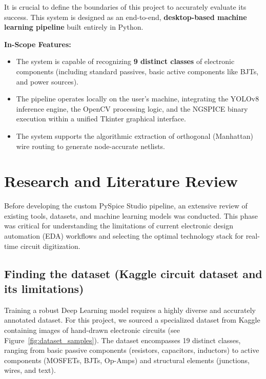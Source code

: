 \documentclass[12pt]{article}
\begin{document}
It is crucial to define the boundaries of this project to accurately evaluate its success. This system is designed as an end-to-end, \textbf{desktop-based machine learning pipeline} built entirely in Python.

\vspace{0.5cm}
\noindent \textbf{In-Scope Features:}
\begin{itemize}
    \item The system is capable of recognizing \textbf{9 distinct classes} of electronic components (including standard passives, basic active components like BJTs, and power sources).
    \item The pipeline operates locally on the user's machine, integrating the YOLOv8 inference engine, the OpenCV processing logic, and the NGSPICE binary execution within a unified Tkinter graphical interface.
    \item The system supports the algorithmic extraction of orthogonal (Manhattan) wire routing to generate node-accurate netlists.
\end{itemize}

\section{Research and Literature Review}

Before developing the custom PySpice Studio pipeline, an extensive review of existing tools, datasets, and machine learning models was conducted. This phase was critical for understanding the limitations of current electronic design automation (EDA) workflows and selecting the optimal technology stack for real-time circuit digitization.

\subsection{Finding the dataset (Kaggle circuit dataset and its limitations)}

Training a robust Deep Learning model requires a highly diverse and accurately annotated dataset. For this project, we sourced a specialized dataset from Kaggle containing images of hand-drawn electronic circuits (see Figure~\ref{fig:dataset_samples}). The dataset encompasses 19 distinct classes, ranging from basic passive components (resistors, capacitors, inductors) to active components (MOSFETs, BJTs, Op-Amps) and structural elements (junctions, wires, and text).
\end{document}
